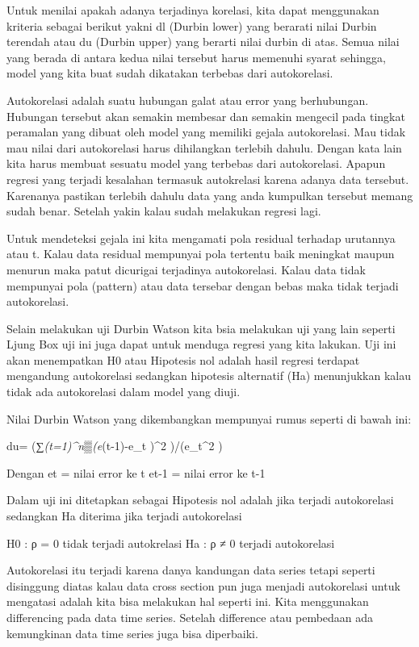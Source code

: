 \documentclass[
]{book}
\theoremstyle{definition}
\theoremstyle{definition}
\theoremstyle{definition}
\theoremstyle{definition}
\theoremstyle{remark}
\begin{document}
Untuk menilai apakah adanya terjadinya korelasi, kita dapat menggunakan kriteria sebagai berikut yakni dl (Durbin lower) yang berarati nilai Durbin terendah atau du (Durbin upper) yang berarti nilai durbin di atas. Semua nilai yang berada di antara kedua nilai tersebut harus memenuhi syarat sehingga, model yang kita buat sudah dikatakan terbebas dari autokorelasi.

Autokorelasi adalah suatu hubungan galat atau error yang berhubungan. Hubungan tersebut akan semakin membesar dan semakin mengecil pada tingkat peramalan yang dibuat oleh model yang memiliki gejala autokorelasi. Mau tidak mau nilai dari autokorelasi harus dihilangkan terlebih dahulu. Dengan kata lain kita harus membuat sesuatu model yang terbebas dari autokorelasi. Apapun regresi yang terjadi kesalahan termasuk autokrelasi karena adanya data tersebut. Karenanya pastikan terlebih dahulu data yang anda kumpulkan tersebut memang sudah benar. Setelah yakin kalau sudah melakukan regresi lagi.

Untuk mendeteksi gejala ini kita mengamati pola residual terhadap urutannya atau t. Kalau data residual mempunyai pola tertentu baik meningkat maupun menurun maka patut dicurigai terjadinya autokorelasi. Kalau data tidak mempunyai pola (pattern) atau data tersebar dengan bebas maka tidak terjadi autokorelasi.

Selain melakukan uji Durbin Watson kita bsia melakukan uji yang lain seperti Ljung Box uji ini juga dapat untuk menduga regresi yang kita lakukan. Uji ini akan menempatkan H0 atau Hipotesis nol adalah hasil regresi terdapat mengandung autokorelasi sedangkan hipotesis alternatif (Ha) menunjukkan kalau tidak ada autokorelasi dalam model yang diuji.

Nilai Durbin Watson yang dikembangkan mempunyai rumus seperti di bawah ini:

du= (∑\emph{(t=1)\^{}n▒(e}(t-1)-e\_t )\^{}2 )/(e\_t\^{}2 )

Dengan et = nilai error ke t
et-1 = nilai error ke t-1

Dalam uji ini ditetapkan sebagai Hipotesis nol adalah jika terjadi autokorelasi sedangkan Ha diterima jika terjadi autokorelasi

H0 : ρ = 0 tidak terjadi autokrelasi
Ha : ρ ≠ 0 terjadi autokorelasi

Autokorelasi itu terjadi karena danya kandungan data series tetapi seperti disinggung diatas kalau data cross section pun juga menjadi autokorelasi untuk mengatasi adalah kita bisa melakukan hal seperti ini. Kita menggunakan differencing pada data time series. Setelah difference atau pembedaan ada kemungkinan data time series juga bisa diperbaiki.
\end{document}
